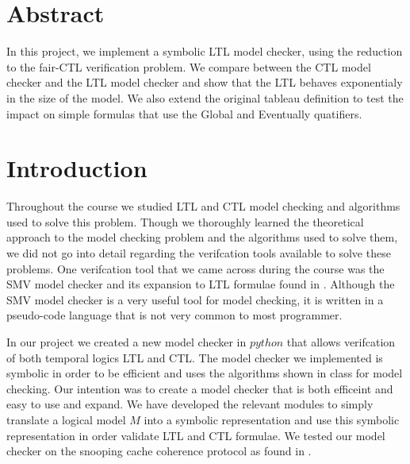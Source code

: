 \documentclass[11pt]{article}
\begin{document}
\maketitle


\section{Abstract}

   In this project, we implement a symbolic LTL model checker, using the reduction to the fair-CTL verification
   problem. We compare between the CTL model checker and the LTL model checker and show that the LTL behaves
   exponentialy in the size of the model. We also extend the original tableau definition to test the impact
   on simple formulas that use the Global and Eventually quatifiers.

\section{Introduction}
   Throughout the course we studied LTL and CTL model checking and algorithms
   used to solve this problem. Though we thoroughly learned the theoretical 
   approach to the model checking problem and the algorithms used to solve them, we did not
   go into detail regarding the verifcation tools available to solve these problems.
   One verifcation tool that we came across during the course was the SMV model
   checker and its expansion to LTL formulae found in \cite{ltl}. Although the
   SMV model checker is a very useful tool for model checking, it is written
   in a pseudo-code language that is not very common to most programmer.
   
   In our project we created a new model checker in $python$ that allows
   verifcation of both temporal logics LTL and CTL. The model checker we
   implemented is symbolic in order to be efficient and uses the algorithms
   shown in class for model checking. Our intention was to create a model
   checker that is both efficeint and easy to use and expand. We have developed
   the relevant modules to simply translate a logical model $M$ into a symbolic
   representation and use this symbolic representation in order validate
   LTL and CTL formulae.
   We tested our model checker on the snooping cache coherence protocol as
   found in \cite{cache}. 
   
\end{document}

